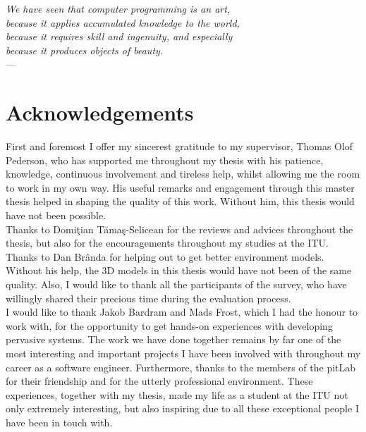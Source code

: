 
\begin{flushright}{\slshape    
    We have seen that computer programming is an art, \\ 
    because it applies accumulated knowledge to the world, \\ 
    because it requires skill and ingenuity, and especially \\
    because it produces objects of beauty.} \\ \medskip
    ---  \citep{knuth:1974}
\end{flushright}


\bigskip

\begingroup
\let\clearpage\relax
\let\cleardoublepage\relax
\let\cleardoublepage\relax
\chapter*{Acknowledgements}
First and foremost I offer my sincerest gratitude to my supervisor, Thomas Olof Pederson, who has supported me throughout my thesis with his patience, knowledge, continuous involvement and tireless help, whilst allowing me the room to work in my own way. His useful remarks and engagement through this master thesis helped in shaping the quality of this work. Without him, this thesis would have not been possible.\\

Thanks to Domi\c tian T\u ama\c s-Selicean for the reviews and advices throughout the thesis, but also for the encouragements throughout my studies at the ITU. Thanks to Dan Br\^{a}nda for helping out to get better environment models. Without his help, the 3D models in this thesis would have not been of the same quality. Also, I would like to thank all the participants of the survey, who have willingly shared their precious time during the evaluation process.\\

I would like to thank Jakob Bardram and Mads Frost, which I had the honour to work with, for the opportunity to get hands-on experiences with developing pervasive systems. The work we have done together remains by far one of the most interesting and important projects I have been involved with throughout my career as a software engineer. Furthermore, thanks to the members of the pitLab for their friendship and for the utterly professional environment. These experiences, together with my thesis, made my life as a student at the ITU not only extremely interesting, but also inspiring due to all these exceptional people I have been in touch with.\\

